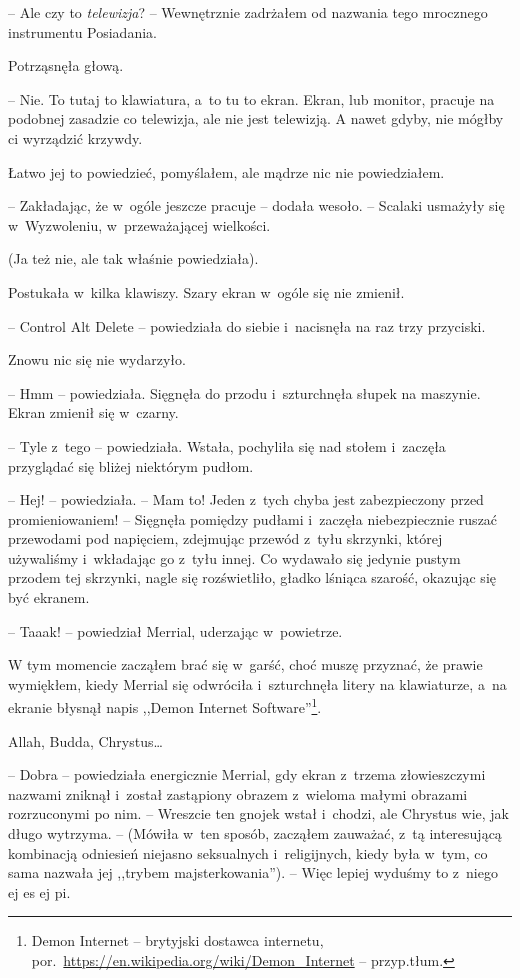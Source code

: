 \documentclass[oneside,polish,11pt,sfheadings]{mwbk}
\begin{document}
-- Ale czy to \textit{telewizja}? -- Wewnętrznie zadrżałem od nazwania tego
mrocznego instrumentu Posiadania.

Potrząsnęła głową. 

-- Nie. To tutaj to klawiatura, a~to tu to ekran.
Ekran, lub monitor, pracuje na podobnej zasadzie co telewizja, ale nie
jest telewizją. A nawet gdyby, nie mógłby ci wyrządzić krzywdy.

Łatwo jej to powiedzieć, pomyślałem, ale mądrze nic nie powiedziałem.

-- Zakładając, że w~ogóle jeszcze pracuje -- dodała wesoło. -- Scalaki
usmażyły się w~Wyzwoleniu, w~przeważającej wielkości.

(Ja też nie, ale tak właśnie powiedziała).

Postukała w~kilka klawiszy. Szary ekran w~ogóle się nie zmienił.

-- Control Alt Delete -- powiedziała do siebie i~nacisnęła na raz trzy
przyciski.

Znowu nic się nie wydarzyło.

-- Hmm -- powiedziała. Sięgnęła do przodu i~szturchnęła słupek na
maszynie. Ekran zmienił się w~czarny.

-- Tyle z~tego -- powiedziała. Wstała, pochyliła się nad stołem i~zaczęła
przyglądać się bliżej niektórym pudłom.

-- Hej! -- powiedziała. -- Mam to! Jeden z~tych chyba jest zabezpieczony
przed promieniowaniem! -- Sięgnęła pomiędzy pudłami i~zaczęła
niebezpiecznie ruszać przewodami pod napięciem, zdejmując przewód z~tyłu
skrzynki, której używaliśmy i~wkładając go z~tyłu innej. Co wydawało się
jedynie pustym przodem tej skrzynki, nagle się rozświetliło, gładko
lśniąca szarość, okazując się być ekranem.

-- Taaak! -- powiedział Merrial, uderzając w~powietrze.

W tym momencie zacząłem brać się w~garść, choć muszę przyznać, że prawie
wymiękłem, kiedy Merrial się odwróciła i~szturchnęła litery na
klawiaturze, a~na ekranie błysnął napis ,,Demon Internet Software''\footnote{
Demon Internet -- brytyjski dostawca internetu,
por.~\url{https://en.wikipedia.org/wiki/Demon\_Internet} -- przyp.tłum.}.

Allah, Budda, Chrystus\ldots

-- Dobra -- powiedziała energicznie Merrial, gdy ekran z~trzema
złowieszczymi nazwami zniknął i~został zastąpiony obrazem z~wieloma
małymi obrazami rozrzuconymi po nim. -- Wreszcie ten gnojek wstał i~chodzi, ale Chrystus wie, jak długo wytrzyma. -- (Mówiła w~ten sposób,
zacząłem zauważać, z~tą interesującą kombinacją odniesień niejasno
seksualnych i~religijnych, kiedy była w~tym, co sama nazwała jej
,,trybem majsterkowania''). -- Więc lepiej wyduśmy to z~niego ej es ej
pi.
\end{document}
